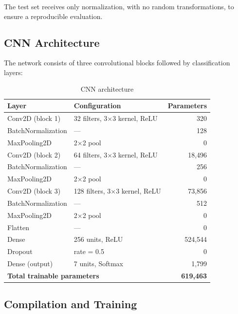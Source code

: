 \documentclass[12pt, a4paper]{article}
\begin{document}
The test set receives only normalization, with no random transformations, to ensure a
reproducible evaluation.

\subsection{CNN Architecture}

The network consists of three convolutional blocks followed by classification layers:

\begin{table}[H]
  \centering
  \caption{CNN architecture}
  \begin{tabular}{llr}
    \toprule
    \textbf{Layer} & \textbf{Configuration} & \textbf{Parameters} \\
    \midrule
    Conv2D (block 1)         & 32 filters, 3×3 kernel, ReLU  & 320 \\
    BatchNormalization        & ---                           & 128 \\
    MaxPooling2D              & 2×2 pool                      & 0   \\
    Conv2D (block 2)         & 64 filters, 3×3 kernel, ReLU  & 18,496 \\
    BatchNormalization        & ---                           & 256 \\
    MaxPooling2D              & 2×2 pool                      & 0   \\
    Conv2D (block 3)         & 128 filters, 3×3 kernel, ReLU & 73,856 \\
    BatchNormalization        & ---                           & 512 \\
    MaxPooling2D              & 2×2 pool                      & 0   \\
    Flatten                   & ---                           & 0   \\
    Dense                     & 256 units, ReLU               & 524,544 \\
    Dropout                   & rate = 0.5                    & 0   \\
    Dense (output)            & 7 units, Softmax              & 1,799 \\
    \midrule
    \multicolumn{2}{l}{\textbf{Total trainable parameters}} & \textbf{619,463} \\
    \bottomrule
  \end{tabular}
\end{table}

\subsection{Compilation and Training}
\end{document}
